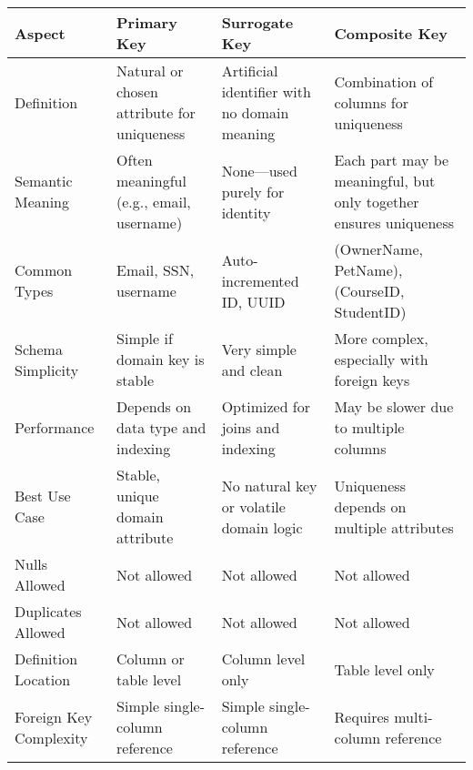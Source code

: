 \begin{NxLightBox}[title={Composite Key Principles}]
	\begin{tabularx}{\linewidth}{|l|X|X|X|}
		\hline
		\textbf{Aspect} & \textbf{Primary Key} & \textbf{Surrogate Key} & \textbf{Composite Key} \\
		\hline
		Definition & Natural or chosen attribute for uniqueness & Artificial identifier with no domain meaning & Combination of columns for uniqueness \\
		\hline
		Semantic Meaning & Often meaningful (e.g., email, username) & None—used purely for identity & Each part may be meaningful, but only together ensures uniqueness \\
		\hline
		Common Types & Email, SSN, username & Auto-incremented ID, UUID & (OwnerName, PetName), (CourseID, StudentID) \\
		\hline
		Schema Simplicity & Simple if domain key is stable & Very simple and clean & More complex, especially with foreign keys \\
		\hline
		Performance & Depends on data type and indexing & Optimized for joins and indexing & May be slower due to multiple columns \\
		\hline
		Best Use Case & Stable, unique domain attribute & No natural key or volatile domain logic & Uniqueness depends on multiple attributes \\
		\hline
		Nulls Allowed & Not allowed & Not allowed & Not allowed \\
		\hline
		Duplicates Allowed & Not allowed & Not allowed & Not allowed \\
		\hline
		Definition Location & Column or table level & Column level only & Table level only \\
		\hline
		Foreign Key Complexity & Simple single-column reference & Simple single-column reference & Requires multi-column reference \\
		\hline
	\end{tabularx}
\end{NxLightBox}

\begin{NxLightListBox}[title={Foreign Key Principles}]
\end{NxLightListBox}

